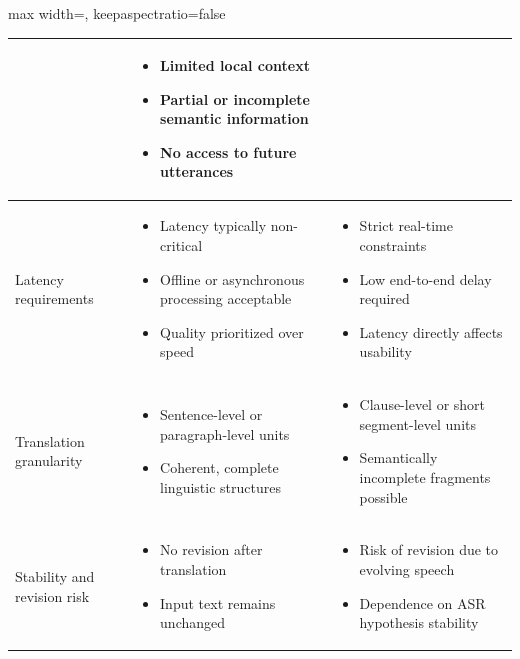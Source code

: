 \begin{table}[!htbp]
\begin{adjustbox}{max width=\textwidth, keepaspectratio=false}
\begin{tabular}{p{4.3cm} p{7.5cm} p{7.5cm}}
      &
      \begin{itemize}[nosep,leftmargin=*]
        \item Limited local context
        \item Partial or incomplete semantic information
        \item No access to future utterances
      \end{itemize} \\
      \midrule
      Latency requirements 
      &
      \begin{itemize}[nosep,leftmargin=*]
        \item Latency typically non-critical
        \item Offline or asynchronous processing acceptable
        \item Quality prioritized over speed
      \end{itemize}
      &
      \begin{itemize}[nosep,leftmargin=*]
        \item Strict real-time constraints
        \item Low end-to-end delay required
        \item Latency directly affects usability
      \end{itemize} \\
      \midrule
      Translation granularity 
      &
      \begin{itemize}[nosep,leftmargin=*]
        \item Sentence-level or paragraph-level units
        \item Coherent, complete linguistic structures
      \end{itemize}
      &
      \begin{itemize}[nosep,leftmargin=*]
        \item Clause-level or short segment-level units
        \item Semantically incomplete fragments possible
      \end{itemize} \\
      \midrule
      Stability and revision risk 
      &
      \begin{itemize}[nosep,leftmargin=*]
        \item No revision after translation
        \item Input text remains unchanged
      \end{itemize}
      &
      \begin{itemize}[nosep,leftmargin=*]
        \item Risk of revision due to evolving speech
        \item Dependence on ASR hypothesis stability
      \end{itemize} \\
      \bottomrule
    \end{tabular}
  \end{adjustbox}
\end{table}

